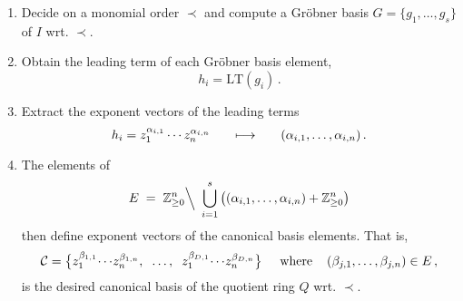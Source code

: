 \documentclass[dvipsnames,preprint,12pt,sort&compress]{elsarticle}
\begin{document}
\begin{enumerate}
\item  Decide on a monomial order $\prec$ and compute a Gr{\"o}bner basis
$G = \{ g_1, \ldots, g_s\}$ of $I$ wrt. $\prec$.\\[1mm]

\item  Obtain the leading term of each Gr{\"o}bner basis element,
\begin{equation}
h_i = \mathrm{LT}(g_i) \,.
\end{equation}
\vspace{-5mm}

\item Extract the exponent vectors of the leading terms
\begin{equation}
h_i = z_1^{\alpha_{i,1}} \cdots z_n^{\alpha_{i,n}} \hspace{6mm} \longmapsto \hspace{6mm} (\alpha_{i,1}, \ldots, \alpha_{i,n}) \,.
\end{equation}
\vspace{-5mm}

\item The elements of
\begin{equation}
E \hspace{1mm}=\hspace{1mm} \mathbb{Z}_{\geq 0}^n \Big\backslash
\hspace{1.2mm} \bigcup_{i=1}^s \big(  (\alpha_{i,1}, \ldots, \alpha_{i,n}) + \mathbb{Z}_{\geq 0}^n  \big)
\label{eq:exponent_vectors_of_can_basis}
\end{equation}
then define exponent vectors of the canonical basis elements. That is,
\begin{equation}
\mathcal{C} = \big\{ z_1^{\beta_{1,1}} \hspace{-0.5mm} \cdots \hspace{-0.5mm} z_n^{\beta_{1,n}},
\hspace{2mm} \ldots, \hspace{2mm} z_1^{\beta_{D,1}} \hspace{-0.5mm} \cdots \hspace{-0.5mm}
z_n^{\beta_{D,n}} \big\} \hspace{5mm} \mathrm{where} \hspace{4mm}  (\beta_{j,1}, \ldots, \beta_{j,n}) \in E \,,
\end{equation}
is the desired canonical basis of the quotient ring $Q$ wrt. $\prec$.
\end{enumerate}
\end{document}
